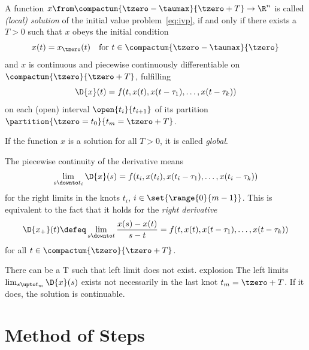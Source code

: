     \begin{definition}\label{def:solution-dde}
        A function $x\from\compactum{\tzero-\taumax}{\tzero+T}\to\R^n$ is called \emph{(local) solution} of the initial value problem~\eqref{eq:ivp}, if and only if there exists a $T>0$ such that
        $x$ obeys the initial condition
        \begin{equation*}
            x(t) = x_{\tzero}(t) \quad\text{for } t\in\compactum{\tzero-\taumax}{\tzero}
        \end{equation*}
        and $x$ is continuous and piecewise continuously differentiable on $\compactum{\tzero}{\tzero+T}$, fulfilling
        \begin{equation*}
            \D{x}(t) = f(t,x(t),x(t-\tau_1),\ldots,x(t-\tau_k))
        \end{equation*}
        on each (open) interval $\open{t_i}{t_{i+1}}$ of its partition $\partition{\tzero=t_0}{t_m=\tzero+T}$.
        
        If the function $x$ is a solution for all $T>0$, it is called \emph{global}.   
    \end{definition}
    
    The piecewise continuity of the derivative means
    \begin{equation*}
        \lim_{s\downto t_i}\D{x}(s) = f(t_i,x(t_i),x(t_i-\tau_1),\ldots,x(t_i-\tau_k))
    \end{equation*}
    for the right limits in the knots $t_i$, $i\in\set{\range{0}{m-1}}$.
    This is equivalent to the fact that it holds for the \emph{right derivative}
    \begin{equation*}
        \D{x_+}(t)\defeq
        \lim_{s\downto t}\frac{x(s)-x(t)}{s-t}
        = f(t,x(t),x(t-\tau_1),\ldots,x(t-\tau_k))
    \end{equation*}
    for all $t\in\compactum{\tzero}{\tzero+T}$.

    There can be a T such that left limit does not exist. explosion
    The left limits $\lim_{s\upto t_m}\D{x}(s)$ exists not necessarily in the last knot $t_m=\tzero+T$. If it does, the solution is continuable.


\section{Method of Steps}
    \label{sec:method-of-steps}
    
